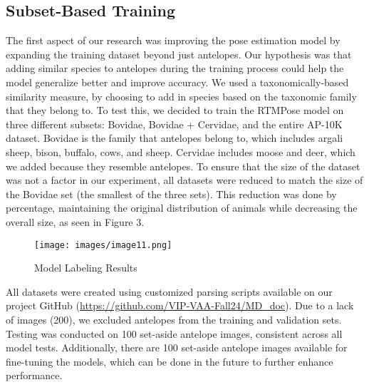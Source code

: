 \documentclass[conference]{IEEEtran}
\begin{document}
\subsection{Subset-Based Training}
The first aspect of our research was improving the pose estimation model by expanding the training dataset beyond just antelopes. Our hypothesis was that adding similar species to antelopes during the training process could help the model generalize better and improve accuracy. We used a taxonomically-based similarity measure, by choosing to add in species based on the taxonomic family that they belong to. To test this, we decided to train the RTMPose \cite{rtmpose} model on three different subsets: Bovidae, Bovidae + Cervidae, and the entire AP-10K \cite{AP10K} dataset.
Bovidae is the family that antelopes belong to, which includes argali sheep, bison, buffalo, cows, and sheep.
Cervidae includes moose and deer, which we added because they resemble antelopes.
To ensure that the size of the dataset was not a factor in our experiment, all datasets were reduced to match the size of the Bovidae set (the smallest of the three sets).
This reduction was done by percentage, maintaining the original distribution of animals while decreasing the overall size, as seen in Figure 3.

\begin{figure}[htbp]
    \centerline{\texttt{[image: images/image11.png]}}
    \caption{Model Labeling Results}
    \label{fig:example}
\end{figure}
All datasets were created using customized parsing scripts available on our project GitHub\cite{github} (\url{https://github.com/VIP-VAA-Fall24/MD_doc}).
Due to a lack of images (200), we excluded antelopes from the training and validation sets.
Testing was conducted on 100 set-aside antelope images, consistent across all model tests.
Additionally, there are 100 set-aside antelope images available for fine-tuning the models, which can be done in the future to further enhance performance.


\end{document}
